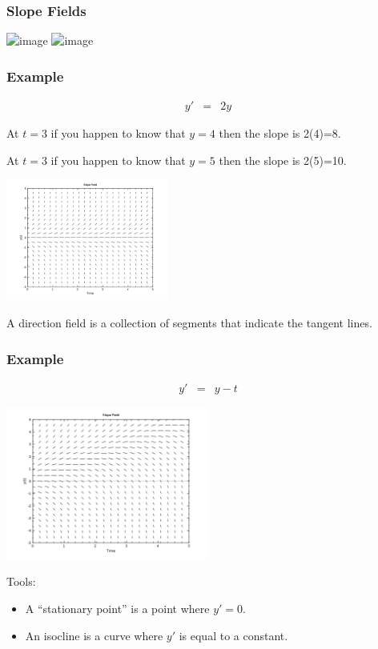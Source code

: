 \begin{frame}
  \frametitle{Slope Fields}

  \includegraphics<1| handout:1>[height=8cm]{img/singlePointInSlopeField}
  \includegraphics<2| handout:2>[height=8cm]{img/singlePointWithSlopeField}

\end{frame}


\begin{frame}
  \frametitle{Example}

  \vspace*{-4em}

  \begin{eqnarray*}
    y' & = & 2y
  \end{eqnarray*}

  At $t=3$ if you happen to know that $y=4$ then the slope is 2(4)=8.

  At $t=3$ if you happen to know that $y=5$ then the slope is 2(5)=10.

  \includegraphics[height=4cm]{img/week1Day2SlopeField}

  A direction field is a collection of segments that indicate the
  tangent lines. 
  
\end{frame}


\begin{frame}
  \frametitle{Example}

  \vspace*{-4em}

  \begin{eqnarray*}
    y' & = & y - t
  \end{eqnarray*}

  \includegraphics[height=5cm]{img/week1Day2SlopeField2}

  Tools:
  \begin{itemize}
  \item A ``stationary point'' is a point where $y'=0$.
  \item An isocline is a curve where $y'$ is equal to a constant.
  \end{itemize}

\end{frame}


